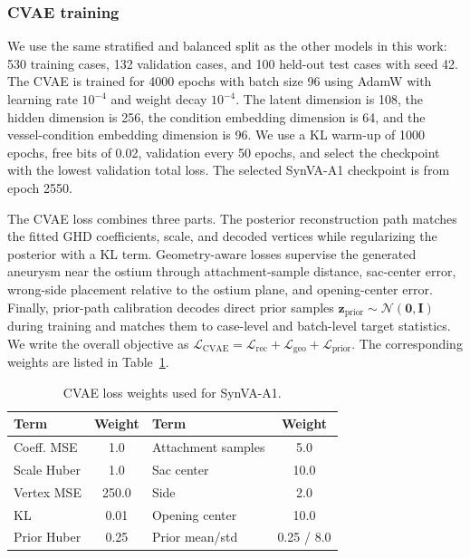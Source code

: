 \subsubsection{CVAE training}

We use the same stratified and balanced split as the other models in this
work: 530 training cases, 132 validation cases, and 100 held-out test cases
with seed 42. The CVAE is trained for 4000 epochs with batch size 96 using
AdamW with learning rate $10^{-4}$ and weight decay $10^{-4}$. The latent
dimension is 108, the hidden dimension is 256, the condition embedding
dimension is 64, and the vessel-condition embedding dimension is 96. We use a
KL warm-up of 1000 epochs, free bits of 0.02, validation every 50 epochs, and
select the checkpoint with the lowest validation total loss. The selected
SynVA-A1 checkpoint is from epoch 2550.

The CVAE loss combines three parts. The posterior reconstruction path matches
the fitted GHD coefficients, scale, and decoded vertices while regularizing
the posterior with a KL term. Geometry-aware losses supervise the generated
aneurysm near the ostium through attachment-sample distance, sac-center error,
wrong-side placement relative to the ostium plane, and opening-center error.
Finally, prior-path calibration decodes direct prior samples
$\bm{z}_{\mathrm{prior}}\sim\mathcal{N}(\bm{0},\bm{I})$ during training and
matches them to case-level and batch-level target statistics. We write the
overall objective as
$\mathcal{L}_{\mathrm{CVAE}}=\mathcal{L}_{\mathrm{rec}}+\mathcal{L}_{\mathrm{geo}}+\mathcal{L}_{\mathrm{prior}}$.
The corresponding weights are listed in
Table~\ref{tab:synva-a1-cvae-loss-weights}.

\begin{table}[t]
\centering
\caption{CVAE loss weights used for SynVA-A1.}
\label{tab:synva-a1-cvae-loss-weights}
\scriptsize
\begin{tabular}{lclc}
\toprule
Term & Weight & Term & Weight \\
\midrule
Coeff. MSE & 1.0 & Attachment samples & 5.0 \\
Scale Huber & 1.0 & Sac center & 10.0 \\
Vertex MSE & 250.0 & Side & 2.0 \\
KL & 0.01 & Opening center & 10.0 \\
Prior Huber & 0.25 & Prior mean/std & 0.25 / 8.0 \\
\bottomrule
\end{tabular}
\end{table}

